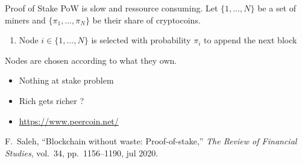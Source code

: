 \documentclass{beamer}
\begin{document}
\begin{frame}{Proof of Stake}
PoW is slow and ressource consuming. Let $\{1,\ldots, N\}$ be a set of miners and $\{\pi_1,\ldots, \pi_N\}$ be their share of cryptocoins.
\begin{tcolorbox}[enhanced,drop shadow, title=PoS]
\begin{enumerate}
\item Node $i\in \{1,\ldots, N\}$ is selected with probability $\pi_i$ to append the next block
\end{enumerate}
\end{tcolorbox}
\vspace{0.3cm}
Nodes are chosen according to what they own.
\begin{itemize}
  \item Nothing at stake problem
  \item Rich gets richer ? 
  \item \url{https://www.peercoin.net/}
\end{itemize}
\footnotesize{
\begin{thebibliography}{1}
F.~Saleh, ``Blockchain without waste: Proof-of-stake,'' {\em The Review of
  Financial Studies}, vol.~34, pp.~1156--1190, jul 2020.
\end{thebibliography}}
\end{frame}
\end{document}
